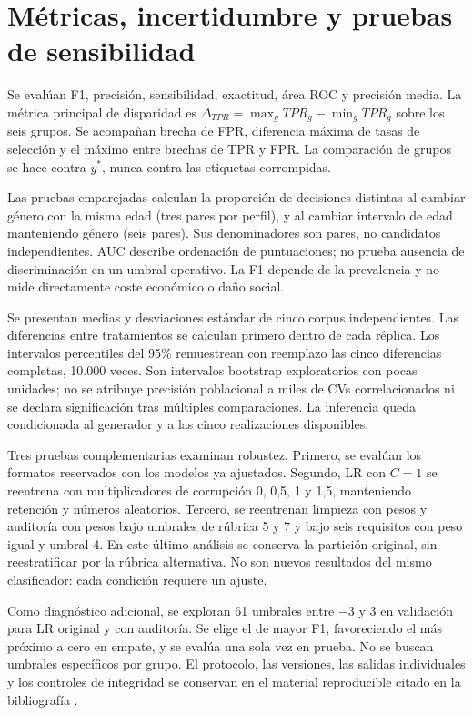 \section{Métricas, incertidumbre y pruebas de sensibilidad}
Se evalúan F1, precisión, sensibilidad, exactitud, área ROC y precisión media. La métrica principal de disparidad es $\Delta_{TPR}=\max_gTPR_g-\min_gTPR_g$ sobre los seis grupos. Se acompañan brecha de FPR, diferencia máxima de tasas de selección y el máximo entre brechas de TPR y FPR. La comparación de grupos se hace contra $y^*$, nunca contra las etiquetas corrompidas.

Las pruebas emparejadas calculan la proporción de decisiones distintas al cambiar género con la misma edad (tres pares por perfil), y al cambiar intervalo de edad manteniendo género (seis pares). Sus denominadores son pares, no candidatos independientes. AUC describe ordenación de puntuaciones; no prueba ausencia de discriminación en un umbral operativo. La F1 depende de la prevalencia y no mide directamente coste económico o daño social.

Se presentan medias y desviaciones estándar de cinco corpus independientes. Las diferencias entre tratamientos se calculan primero dentro de cada réplica. Los intervalos percentiles del 95\% remuestrean con reemplazo las cinco diferencias completas, 10.000 veces. Son intervalos bootstrap exploratorios con pocas unidades; no se atribuye precisión poblacional a miles de CVs correlacionados ni se declara significación tras múltiples comparaciones. La inferencia queda condicionada al generador y a las cinco realizaciones disponibles.

Tres pruebas complementarias examinan robustez. Primero, se evalúan los formatos reservados con los modelos ya ajustados. Segundo, LR con $C=1$ se reentrena con multiplicadores de corrupción 0, 0,5, 1 y 1,5, manteniendo retención y números aleatorios. Tercero, se reentrenan limpieza con pesos y auditoría con pesos bajo umbrales de rúbrica 5 y 7 y bajo seis requisitos con peso igual y umbral 4. En este último análisis se conserva la partición original, sin reestratificar por la rúbrica alternativa. No son nuevos resultados del mismo clasificador: cada condición requiere un ajuste.

Como diagnóstico adicional, se exploran 61 umbrales entre $-3$ y $3$ en validación para LR original y con auditoría. Se elige el de mayor F1, favoreciendo el más próximo a cero en empate, y se evalúa una sola vez en prueba. No se buscan umbrales específicos por grupo. El protocolo, las versiones, las salidas individuales y los controles de integridad se conservan en el material reproducible citado en la bibliografía \cite{repositorio2026}.

